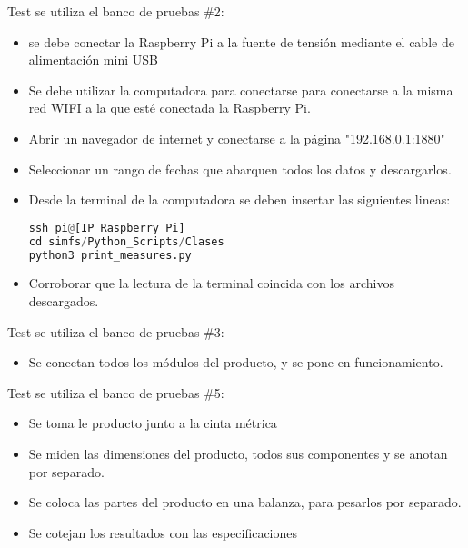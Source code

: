Test \TBC se utiliza el banco de pruebas \#2: 	
\begin{itemize}
\item se debe conectar la Raspberry Pi a la fuente de tensión mediante el cable de alimentación mini USB
\item Se debe utilizar la computadora para conectarse para conectarse a la misma red WIFI a la que esté conectada la Raspberry Pi.
\item Abrir un navegador de internet y conectarse a la página "192.168.0.1:1880"
\item Seleccionar un rango de fechas que abarquen todos los datos y descargarlos.
\item Desde la terminal de la computadora se deben insertar las siguientes lineas:
\begin{lstlisting}[language=Python]
ssh pi@[IP Raspberry Pi] 
cd simfs/Python_Scripts/Clases
python3 print_measures.py
\end{lstlisting}

\item Corroborar que la lectura de la terminal coincida con los archivos descargados.
\end{itemize}


Test \TBC se utiliza el banco de pruebas \#3:

\begin{itemize}
\item Se conectan todos los módulos del producto, y se pone en funcionamiento.
\TBC
\end{itemize}
Test \TBC se utiliza el banco de pruebas \#5:
\begin{itemize}
\item Se toma le producto junto a la cinta métrica
\item Se miden las dimensiones del producto, todos sus componentes y se anotan por separado.
\item Se coloca las partes del producto en una balanza, para pesarlos por separado.
\item Se cotejan los resultados con las especificaciones 
\end{itemize}

